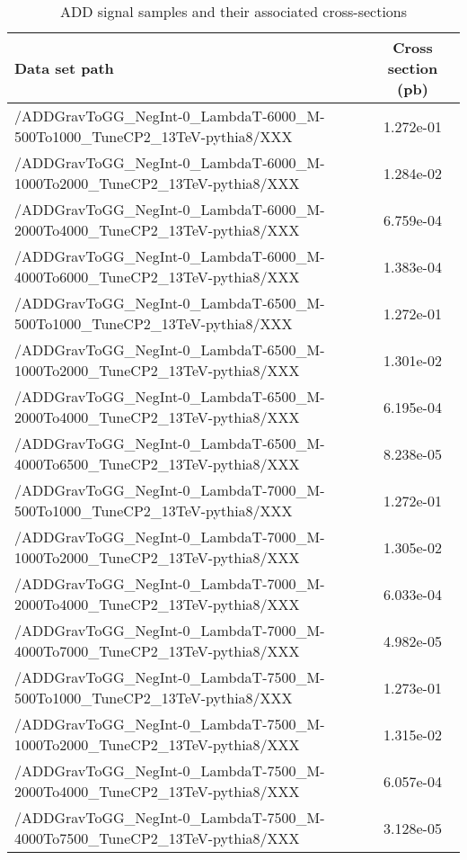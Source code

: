 \begin{landscape}
\begin{table}[!htbp]
       \caption{ ADD signal samples and their associated cross-sections }
       \centering
       \vspace{\baselineskip}
       \begin{tabular}{lc}
       \hline \hline
       Data set path & Cross section (pb)\\
       \hline

/ADDGravToGG\_NegInt-0\_LambdaT-6000\_M-500To1000\_TuneCP2\_13TeV-pythia8/XXX &  1.272e-01\\
/ADDGravToGG\_NegInt-0\_LambdaT-6000\_M-1000To2000\_TuneCP2\_13TeV-pythia8/XXX &  1.284e-02\\
/ADDGravToGG\_NegInt-0\_LambdaT-6000\_M-2000To4000\_TuneCP2\_13TeV-pythia8/XXX &  6.759e-04\\
/ADDGravToGG\_NegInt-0\_LambdaT-6000\_M-4000To6000\_TuneCP2\_13TeV-pythia8/XXX &  1.383e-04\\
/ADDGravToGG\_NegInt-0\_LambdaT-6500\_M-500To1000\_TuneCP2\_13TeV-pythia8/XXX &  1.272e-01\\
/ADDGravToGG\_NegInt-0\_LambdaT-6500\_M-1000To2000\_TuneCP2\_13TeV-pythia8/XXX &  1.301e-02\\
/ADDGravToGG\_NegInt-0\_LambdaT-6500\_M-2000To4000\_TuneCP2\_13TeV-pythia8/XXX &  6.195e-04\\
/ADDGravToGG\_NegInt-0\_LambdaT-6500\_M-4000To6500\_TuneCP2\_13TeV-pythia8/XXX &  8.238e-05\\
/ADDGravToGG\_NegInt-0\_LambdaT-7000\_M-500To1000\_TuneCP2\_13TeV-pythia8/XXX &  1.272e-01\\
/ADDGravToGG\_NegInt-0\_LambdaT-7000\_M-1000To2000\_TuneCP2\_13TeV-pythia8/XXX &  1.305e-02\\
/ADDGravToGG\_NegInt-0\_LambdaT-7000\_M-2000To4000\_TuneCP2\_13TeV-pythia8/XXX &  6.033e-04\\
/ADDGravToGG\_NegInt-0\_LambdaT-7000\_M-4000To7000\_TuneCP2\_13TeV-pythia8/XXX &  4.982e-05\\
/ADDGravToGG\_NegInt-0\_LambdaT-7500\_M-500To1000\_TuneCP2\_13TeV-pythia8/XXX &  1.273e-01\\
/ADDGravToGG\_NegInt-0\_LambdaT-7500\_M-1000To2000\_TuneCP2\_13TeV-pythia8/XXX &  1.315e-02\\
/ADDGravToGG\_NegInt-0\_LambdaT-7500\_M-2000To4000\_TuneCP2\_13TeV-pythia8/XXX &  6.057e-04\\
/ADDGravToGG\_NegInt-0\_LambdaT-7500\_M-4000To7500\_TuneCP2\_13TeV-pythia8/XXX &  3.128e-05\\

       \hline \hline
       \end{tabular}
       \label{table:ADD_signal_samples_xsec}
\end{table}
\end{landscape}


